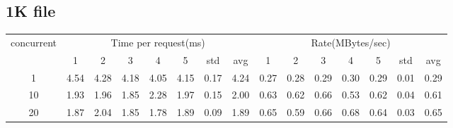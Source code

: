 \documentclass{article}
\begin{document}
\subsection*{1K file}
\begin{table}[H]
    \begin{tabular}{|c|c|c|c|c|c|c|c|c|c|c|c|c|c|c|}
        \hline
        \multirow{2}{*}{concurrent} & \multicolumn{7}{c|}{Time per request(ms)} & \multicolumn{7}{c|}{Rate(MBytes/sec)}                                                                                     \\ \cline{2-15}
                                    & 1                                         & 2                                     & 3    & 4    & 5    & std  & avg  & 1    & 2    & 3    & 4    & 5    & std  & avg  \\ \hline
        1                           & 4.54                                      & 4.28                                  & 4.18 & 4.05 & 4.15 & 0.17 & 4.24 & 0.27 & 0.28 & 0.29 & 0.30 & 0.29 & 0.01 & 0.29 \\ \hline
        10                          & 1.93                                      & 1.96                                  & 1.85 & 2.28 & 1.97 & 0.15 & 2.00 & 0.63 & 0.62 & 0.66 & 0.53 & 0.62 & 0.04 & 0.61 \\ \hline
        20                          & 1.87                                      & 2.04                                  & 1.85 & 1.78 & 1.89 & 0.09 & 1.89 & 0.65 & 0.59 & 0.66 & 0.68 & 0.64 & 0.03 & 0.65 \\ \hline
    \end{tabular}
\end{table}
\end{document}
